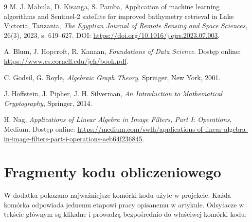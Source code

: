 \documentclass[12pt,a4paper]{article}
\begin{document}
\begin{thebibliography}{9}
M. J. Mabula, D. Kisanga, S. Pamba, Application of machine learning algorithms and Sentinel-2 satellite for improved bathymetry retrieval in Lake Victoria, Tanzania, \textit{The Egyptian Journal of Remote Sensing and Space Sciences}, 26(3), 2023, s. 619--627. DOI: \url{https://doi.org/10.1016/j.ejrs.2023.07.003}.


A. Blum, J. Hopcroft, R. Kannan, \textit{Foundations of Data Science}. Dostęp online: \url{https://www.cs.cornell.edu/jeh/book.pdf}.

C. Godsil, G. Royle, \textit{Algebraic Graph Theory}, Springer, New York, 2001.

J. Hoffstein, J. Pipher, J. H. Silverman, \textit{An Introduction to Mathematical Cryptography}, Springer, 2014.

H. Nag, \textit{Applications of Linear Algebra in Image Filters, Part I: Operations}, Medium. Dostęp online: \url{https://medium.com/swlh/applications-of-linear-algebra-in-image-filters-part-i-operations-aeb64f236845}.

\end{thebibliography}

\appendix
\section{Fragmenty kodu obliczeniowego}
\label{app:kod}

W dodatku pokazano najważniejsze komórki kodu użyte w projekcie. Każda komórka odpowiada jednemu etapowi pracy opisanemu w artykule. Odsyłacze w tekście głównym są klikalne i prowadzą bezpośrednio do właściwej komórki kodu:
\end{document}
